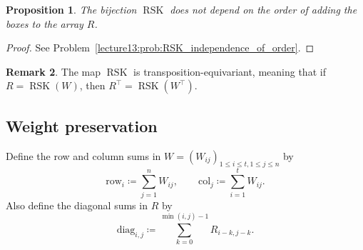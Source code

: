 \documentclass[letterpaper,11pt,oneside,reqno]{book}
\numberwithin{equation}{chapter}  %
\newtheorem{proposition}{Proposition}[chapter]  %
\theoremstyle{definition}
\newtheorem{remark}[proposition]{Remark}
\begin{document}
\begin{proposition}
\label{lecture13:prop:RSK_independence_of_order}
	The bijection $\operatorname{RSK}$ does not depend on the order
	of adding the boxes to the array $R$.
\end{proposition}
\begin{proof}
	See Problem~\ref{lecture13:prob:RSK_independence_of_order}.
\end{proof}

\begin{remark}
	The map $\operatorname{RSK}$
	is transposition-equivariant, meaning that
	if $R=\operatorname{RSK}(W)$, then
	$R^{\top}=\operatorname{RSK}(W^{\top})$.
\end{remark}


\subsection{Weight preservation}

Define
the row and column sums in $W=(W_{ij})_{1\le i\le t, 1\le j\le n}$ by
\begin{equation*}
	\mathrm{row}_i\coloneqq \sum_{j=1}^n W_{ij}, \qquad
	\mathrm{col}_j \coloneqq \sum_{i=1}^t W_{ij}.
\end{equation*}
Also define the diagonal sums in $R$ by
\begin{equation*}
	\mathrm{diag}_{i,j}\coloneqq \sum_{k=0}^{\min(i,j)-1}R_{i-k,j-k}.
\end{equation*}
\end{document}
